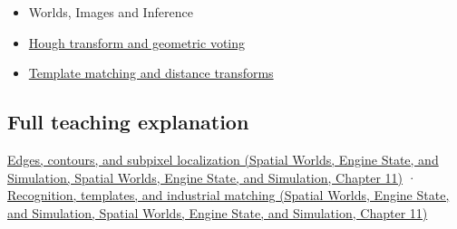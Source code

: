 \begin{itemize}
\tightlist
\item
  {Worlds, Images and Inference}
\item
  \hyperref[appendix-a5b0383b3b3e]{Hough transform and geometric voting}
\item
  \hyperref[appendix-5fb4af80d1c7]{Template matching and distance transforms}
\end{itemize}

\subsection{Full teaching explanation}\label{appendix-36022286b03e-full-teaching-explanation}

\href{../05-Spatial-Worlds-Engine-State-and-Simulation/main.pdf\#nameddest=04-visual-computing-ii-ch030-edges-contours-and-subpixel-localization}{Edges, contours, and subpixel localization (Spatial Worlds, Engine State, and Simulation, Spatial Worlds, Engine State, and Simulation, Chapter 11)} · \href{../05-Spatial-Worlds-Engine-State-and-Simulation/main.pdf\#nameddest=04-visual-computing-ii-ch030-recognition-templates-and-industrial-matching}{Recognition, templates, and industrial matching (Spatial Worlds, Engine State, and Simulation, Spatial Worlds, Engine State, and Simulation, Chapter 11)}
